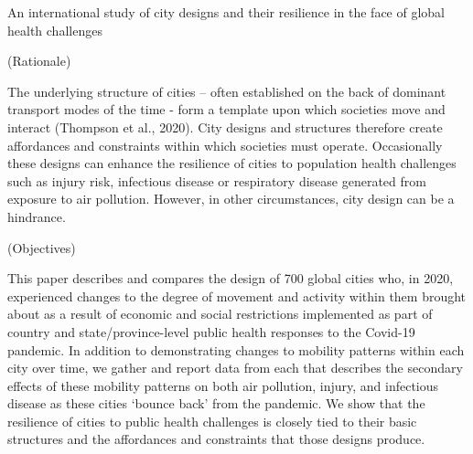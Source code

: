 \documentclass[preprint,12pt]{elsarticle}
\begin{document}
\begin{frontmatter}





\end{frontmatter}



An international study of city designs and their resilience in the face of global health challenges

(Rationale)

The underlying structure of cities – often established on the back of dominant transport modes of the time - form a template upon which societies move and interact (Thompson et al., 2020). City designs and structures therefore create affordances and constraints within which societies must operate. Occasionally these designs can enhance the resilience of cities to population health challenges such as injury risk, infectious disease or respiratory disease generated from exposure to air pollution. However, in other circumstances, city design can be a hindrance.

(Objectives)

This paper describes and compares the design of 700 global cities who, in 2020, experienced changes to the degree of movement and activity within them brought about as a result of economic and social restrictions implemented as part of country and state/province-level public health responses to the Covid-19 pandemic. In addition to demonstrating changes to mobility patterns within each city over time, we gather and report data from each that describes the secondary effects of these mobility patterns on both air pollution, injury, and infectious disease as these cities ‘bounce back’ from the pandemic. We show that the resilience of cities to public health challenges is closely tied to their basic structures and the affordances and constraints that those designs produce.
\end{document}
